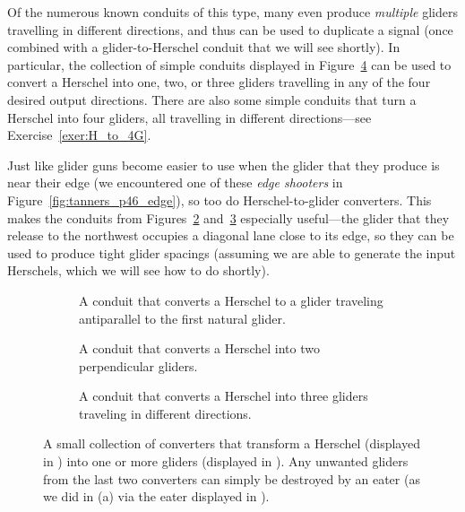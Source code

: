 Of the numerous known conduits of this type, many even produce \emph{multiple} gliders travelling in different directions, and thus can be used to duplicate a signal (once combined with a glider-to-Herschel conduit that we will see shortly). In particular, the collection of simple conduits displayed in Figure~\ref{fig:herschel_to_glider} can be used to convert a Herschel into one, two, or three gliders travelling in any of the four desired output directions. There are also some simple conduits that turn a Herschel into four gliders, all travelling in different directions---see Exercise~\ref{exer:H_to_4G}.

Just like glider guns become easier to use when the glider that they produce is near their edge (we encountered one of these \emph{edge shooters} in Figure~\ref{fig:tanners_p46_edge}), so too do Herschel-to-glider converters. This makes the conduits from Figures~\ref{fig:H_to_2G} and~\ref{fig:H_to_3G} especially useful---the glider that they release to the northwest occupies a diagonal lane close to its edge, so they can be used to produce tight glider spacings (assuming we are able to generate the input Herschels, which we will see how to do shortly).

\begin{figure}[!htb]
	\centering
	\begin{subfigure}{.315\textwidth}
		\centering\vspace*{1.23cm}
		\caption{A conduit that converts a Herschel to a glider traveling antiparallel to the first natural glider.}
		\label{fig:H_to_G}
	\end{subfigure} \hfill %
	\begin{subfigure}{.315\textwidth}
		\centering{}
		\caption{A conduit that converts a Herschel into two perpendicular gliders.}
		\label{fig:H_to_2G}
	\end{subfigure} \hfill %
	\begin{subfigure}{.315\textwidth}
		\centering{}
		\caption{A conduit that converts a Herschel into three gliders traveling in different directions.}
		\label{fig:H_to_3G}
	\end{subfigure}
	\caption{A small collection of converters that transform a Herschel (displayed in ) into one or more gliders (displayed in ). Any unwanted gliders from the last two converters can simply be destroyed by an eater (as we did in (a) via the eater displayed in ).}\label{fig:herschel_to_glider}
\end{figure}

